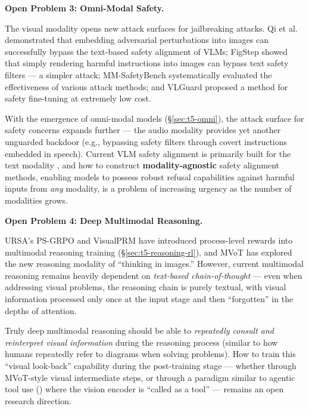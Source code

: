 \begin{openproblembox}
\textbf{Open Problem 3: Omni-Modal Safety.}

The visual modality opens new attack surfaces for jailbreaking attacks.
Qi et al.\ \cite{qi2023visual} demonstrated that embedding adversarial perturbations into images
can successfully bypass the text-based safety alignment of VLMs;
FigStep \cite{gong2023figstep} showed that simply rendering harmful instructions into images
can bypass text safety filters --- a simpler attack;
MM-SafetyBench \cite{liu2023mm-safetybench} systematically evaluated the effectiveness of various attack methods;
and VLGuard \cite{zong2024vlguard} proposed a method for safety fine-tuning at extremely low cost.

With the emergence of omni-modal models (\S\ref{sec:t5-omni}),
the attack surface for safety concerns expands further ---
the audio modality provides yet another unguarded backdoor
(e.g., bypassing safety filters through covert instructions embedded in speech).
Current VLM safety alignment is primarily built for the text modality
,
and how to construct \textbf{modality-agnostic} safety alignment methods,
enabling models to possess robust refusal capabilities against harmful inputs from \textit{any} modality,
is a problem of increasing urgency as the number of modalities grows.
\end{openproblembox}

\begin{openproblembox}
\textbf{Open Problem 4: Deep Multimodal Reasoning.}

URSA's PS-GRPO and VisualPRM have introduced process-level rewards
into multimodal reasoning training (\S\ref{sec:t5-reasoning-rl}),
and MVoT has explored the new reasoning modality of ``thinking in images.''
However, current multimodal reasoning remains heavily dependent on \textit{text-based chain-of-thought} ---
even when addressing visual problems, the reasoning chain is purely textual,
with visual information processed only once at the input stage and then ``forgotten'' in the depths of attention.

Truly deep multimodal reasoning should be able to
\textit{repeatedly consult and reinterpret visual information} during the reasoning process
(similar to how humans repeatedly refer to diagrams when solving problems).
How to train this ``visual look-back'' capability during the post-training stage ---
whether through MVoT-style visual intermediate steps,
or through a paradigm similar to agentic tool use ()
where the vision encoder is ``called as a tool'' ---
remains an open research direction.
\end{openproblembox}

